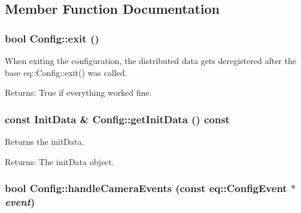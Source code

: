 \subsection{Member Function Documentation}
\hypertarget{a00003_e656952f262b9e5c3354583a04068b97}{
\subsubsection[{exit}]{\setlength{\rightskip}{0pt plus 5cm}bool Config::exit ()}}
\label{a00003_e656952f262b9e5c3354583a04068b97}


When exiting the configuration, the distributed data gets deregistered after the base eq::Config::exit() was called. 

\begin{Desc}
\item[Returns:]True if everything worked fine. \end{Desc}
\hypertarget{a00003_8a5b1862bf80067322a3a0b1f530f751}{
\subsubsection[{getInitData}]{\setlength{\rightskip}{0pt plus 5cm}const {\bf InitData} \& Config::getInitData () const}}
\label{a00003_8a5b1862bf80067322a3a0b1f530f751}


Returns the initData. 

\begin{Desc}
\item[Returns:]The initData object. \end{Desc}
\hypertarget{a00003_b66ac34d32b4e160ec19cb39231395ac}{
\subsubsection[{handleCameraEvents}]{\setlength{\rightskip}{0pt plus 5cm}bool Config::handleCameraEvents (const eq::ConfigEvent $\ast$ {\em event})}}
\label{a00003_b66ac34d32b4e160ec19cb39231395ac}


